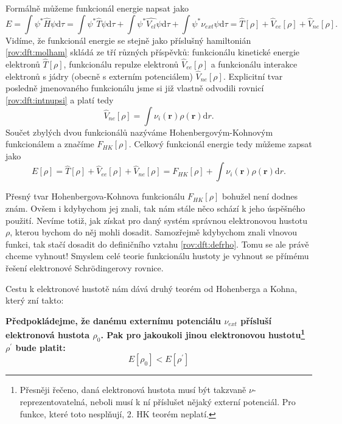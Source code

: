 \bigskip
Formálně můžeme funkcionál energie napsat jako
\begin{equation}
E=\int \psi^*\hat{H}\psi \mathrm{d}\tau = \int \psi^*\hat{T}\psi\mathrm{d}\tau + \int \psi^*\hat{V_{el}}\psi\mathrm{d}\tau + \int \psi^*\nu_{ext}\psi\mathrm{d}\tau=\hat{T}[\rho]+\hat{V}_{ee}[\rho]+\hat{V}_{ne}[\rho] .
\end{equation}
Vidíme, že funkcionál energie se stejně jako příslušný hamiltonián \eqref{rov:dft:molham} skládá ze tří různých příspěvků: funkcionálu kinetické energie elektronů $\hat{T}[\rho]$, funkcionálu repulze elektronů $\hat{V}_{ee}[\rho]$ a funkcionálu interakce elektronů s jádry (obecně s externím potenciálem) $\hat{V}_{ne}[\rho]$. 
Explicitní tvar posledně jmenovaného funkcionálu jsme si již vlastně odvodili rovnicí \eqref{rov:dft:intnupsi} a platí tedy
\begin{equation}
\hat{V}_{ne}[\rho] = \int \nu_i(\textbf{r})\rho(\textbf{r}) \mathrm{d}r .
\end{equation}
Součet zbylých dvou funkcionálů nazýváme Hohenbergovým-Kohnovým funkcionálem a značíme $F_{HK}[\rho]$. 
Celkový funkcionál energie tedy můžeme zapsat jako
\begin{equation}
E[\rho] = \hat{T}[\rho]+\hat{V}_{ee}[\rho]+\hat{V}_{ne}[\rho] = F_{HK}[\rho] + \int \nu_i(\mathbf{r})\rho(\textbf{r}) \mathrm{d}r .
\end{equation}

Přesný tvar Hohenbergova-Kohnova funkcionálu $F_{HK}[\rho]$ bohužel není dodnes znám. 
Ovšem i kdybychom jej znali, tak nám stále něco schází k jeho úspěšného použití. Nevíme totiž, jak získat pro daný systém správnou elektronovou hustotu $\rho$, kterou bychom do něj mohli dosadit. Samozřejmě kdybychom znali vlnovou funkci, tak stačí dosadit do definičního vztahu \eqref{rov:dft:defrho}. Tomu se ale právě chceme vyhnout! Smyslem celé teorie funkcionálu hustoty je vyhnout se přímému řešení elektronové Schr\"{o}dingerovy rovnice.

Cestu k elektronové hustotě nám dává druhý teorém od Hohenberga a Kohna, který zní takto:

\bigskip
\textbf{Předpokládejme, že danému externímu potenciálu $\nu_{ext}$ přísluší elektronová hustota $\rho_0$. Pak pro jakoukoli jinou elektronovou hustotu\footnote{Přesněji řečeno, daná elektronová hustota musí být takzvaně $\nu$-{reprezentovatelná}, neboli musí k ní příslušet nějaký externí potenciál. Pro funkce, které toto nesplňují, 2. HK teorém neplatí.} $\rho^{\prime}$ bude platit:}
\begin{equation}
E[\rho_0] < E[\rho^{\prime}]
\label{rov:dft:HK2}
\end{equation}


